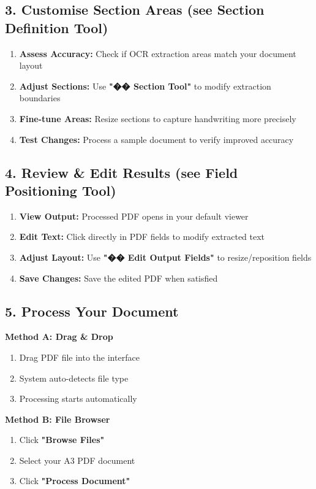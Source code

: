 \documentclass[11pt,a4paper]{article}
\begin{document}
\subsection*{3. \faBook\space Customise Section Areas (see Section Definition Tool)}
\begin{enumerate}[leftmargin=*,itemsep=0pt]
    \item \textbf{Assess Accuracy:} Check if OCR extraction areas match your document layout
    \item \textbf{Adjust Sections:} Use \textcolor{primary}{\textbf{"�� Section Tool"}} to modify extraction boundaries
    \item \textbf{Fine-tune Areas:} Resize sections to capture handwriting more precisely
    \item \textbf{Test Changes:} Process a sample document to verify improved accuracy
\end{enumerate}

\subsection*{4. \faEdit\space Review \& Edit Results (see Field Positioning Tool)}
\begin{enumerate}[leftmargin=*,itemsep=0pt]
    \item \textbf{View Output:} Processed PDF opens in your default viewer
    \item \textbf{Edit Text:} Click directly in PDF fields to modify extracted text
    \item \textbf{Adjust Layout:} Use \textcolor{primary}{\textbf{"�� Edit Output Fields"}} to resize/reposition fields
    \item \textbf{Save Changes:} Save the edited PDF when satisfied
\end{enumerate}

\subsection*{5. \faUpload\space Process Your Document}
\begin{multicols}{2}
\textbf{Method A: Drag \& Drop}
\begin{enumerate}[leftmargin=*,itemsep=0pt]
    \item Drag PDF file into the interface
    \item System auto-detects file type
    \item Processing starts automatically
\end{enumerate}

\textbf{Method B: File Browser}
\begin{enumerate}[leftmargin=*,itemsep=0pt]
    \item Click \textcolor{primary}{\textbf{"Browse Files"}}
    \item Select your A3 PDF document
    \item Click \textcolor{success}{\textbf{"Process Document"}}
\end{enumerate}
\end{multicols}
\end{document}
